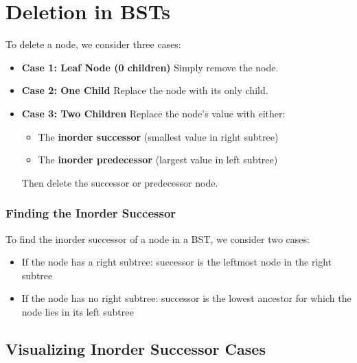 \documentclass{article}
\begin{document}
\section{Deletion in BSTs}

To delete a node, we consider three cases:

\begin{itemize}
  \item \textbf{Case 1: Leaf Node (0 children)}  
    Simply remove the node.
  \item \textbf{Case 2: One Child}  
    Replace the node with its only child.
  \item \textbf{Case 3: Two Children}  
    Replace the node’s value with either:
    \begin{itemize}
      \item The \textbf{inorder successor} (smallest value in right subtree)
      \item The \textbf{inorder predecessor} (largest value in left subtree)
    \end{itemize}
    Then delete the successor or predecessor node.
\end{itemize}

\subsubsection*{Finding the Inorder Successor}

To find the inorder successor of a node in a BST, we consider two cases:

\begin{itemize}
  \item If the node has a right subtree: successor is the leftmost node in the right subtree
  \item If the node has no right subtree: successor is the lowest ancestor for which the node lies in its left subtree
\end{itemize}

\subsection{Visualizing Inorder Successor Cases}
\end{document}
